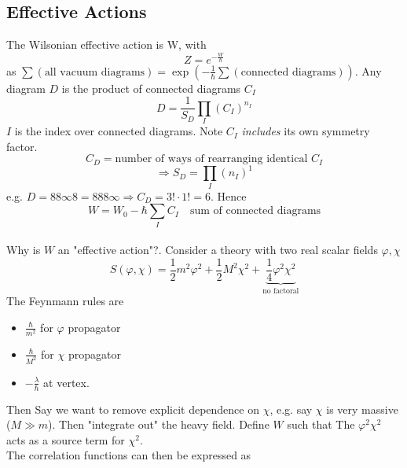 \documentclass{article}
\begin{document}
\subsection{Effective Actions}
The Wilsonian effective action is W, with 
\[
Z = e^{-\frac{W}{\hbar}}
\]
as $\sum(\text{all vacuum diagrams}) = \exp\left( -\frac{1}{\hbar} \sum (\text{connected diagrams}) \right)$.
Any diagram $D$ is the product of connected diagrams $C_I$ 
\[
D = \frac{1}{S_D} \prod_{I} (C_I)^{n_I}
\]
$I$ is the index over connected diagrams. Note $C_I$ \emph{includes} its own symmetry factor. 
\[
C_D = \text{number of ways of rearranging identical } C_I
\]
\[
\Rightarrow S_D = \prod_I (n_I)^1
\]
e.g. $D = 8 8 \infty 8 = 8 8 8 \infty \Rightarrow C_D = 3! \cdot 1! = 6$. 
Hence 
\[
W=W_0 - \hbar \sum_I C_I \quad \text{sum of connected diagrams}
\]
\\
Why is $W$ an "effective action"?. Consider a theory with two real scalar fields $\varphi, \chi$ 
\[
S(\varphi,\chi) = \frac{1}{2}m^2 \varphi^2 + \frac{1}{2}M^2 \chi^2 + \underbrace{\frac{1}{4} \varphi^2 \chi^2}_{\text{no factoral}} 
\]
The Feynmann rules are 
\begin{itemize}
    \item $\frac{\hbar}{m^2}$ for $\varphi$ propagator 
    \item $\frac{\hbar}{M^2}$ for $\chi$ propagator 
    \item $-\frac{\lambda}{\hbar}$ at vertex.
\end{itemize}
Then 
Say we want to remove explicit dependence on $\chi$, e.g. say $\chi$ is very massive ($M\gg m$). Then "integrate out" the heavy field. Define $W$ such that 
The $\varphi^2\chi^2$ acts as a source term for $\chi^2$. \\
The correlation functions can then be expressed as 
\end{document}
